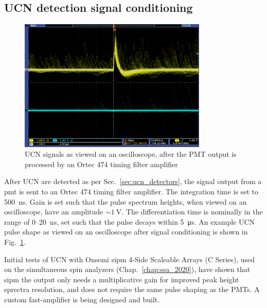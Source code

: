 
\subsection{UCN detection signal conditioning}\label{sec:signal_conditioning}


 \begin{figure}
    \centering
    \includegraphics[width=0.8\textwidth]{figures/pmt_scope.png}
    \caption
     {UCN signals as viewed on an oscilloscope, after the PMT output is processed by an Ortec 474 timing filter amplifier}
    \label{fig:scope_image}
\end{figure}

After UCN are detected as per Sec.~\ref{sec:ucn_detectors}, the signal output from a \gls*{pmt} is sent to an Ortec 474 timing filter amplifier. The integration time is set to \qty{500}{\nano\second}. Gain is set such that the pulse spectrum heights, when viewed on an oscilloscope, have an amplitude $\sim\qty{1}{\volt}$. The differentiation time is nominally in the range of 0--\qty{20}{\nano\second}, set such that the pulse decays within \qty{5}{\micro \second}. An example UCN pulse shape as viewed on an oscilloscope after signal conditioning is shown in Fig.~\ref{fig:scope_image}.

Initial tests of UCN with Onsemi \acrshort*{sipm} 4-Side Scaleable Arrays (C Series), used on the simultaneous spin analyzers (Chap.~\ref{chap:ssa_2020}), have shown that \acrshort*{sipm} the output only needs a multiplicative gain for improved peak height sprectra resolution, and does not require the same pulse shaping as the PMTs. A custom fast-amplifier is being designed and built.

